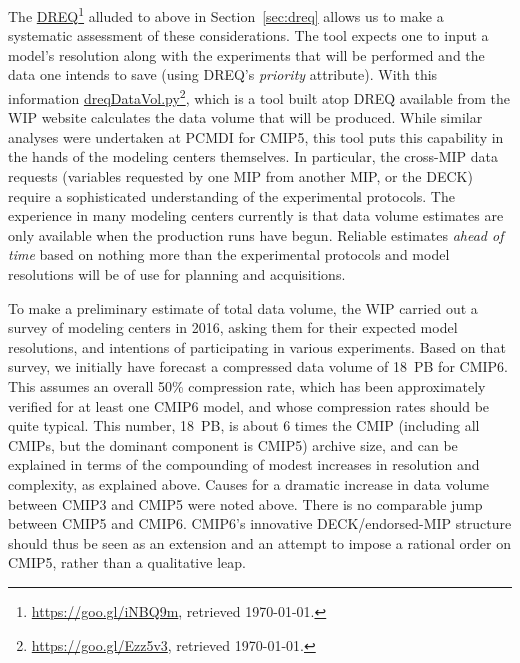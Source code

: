 \documentclass[gmd,manuscript]{copernicus}
\newcommand{\pllabel}[1]{\label{p-#1}\linelabel{l-#1}}
\newcommand{\urlref}[2] {\href{#1}{#2}\footnote{\url{#1}, retrieved \today.}}
\begin{document}
The \urlref{https://goo.gl/iNBQ9m}{DREQ} alluded to above in
Section~\ref{sec:dreq} allows us to make a systematic assessment of these
considerations. The tool expects one to input a model's resolution
along with the experiments that will be performed and the data one
intends to save (using DREQ's \emph{priority} attribute). With this
information
\urlref{https://goo.gl/Ezz5v3}{dreqDataVol.py}, which is a tool 
built atop DREQ available from the WIP website calculates the
data volume that will be produced. While similar
analyses were undertaken at PCMDI for CMIP5, this tool puts this
capability in the hands of the modeling centers themselves.
\pllabel{RC1-26}
In particular, the cross-MIP data requests (variables requested by one
MIP from another MIP, or the DECK) require a sophisticated
understanding of the experimental protocols. The experience in many
modeling centers currently is that data volume estimates are only
available when the production runs have begun. Reliable estimates
\emph{ahead of time} based on nothing more than the experimental
protocols and model resolutions will be of use for planning and
acquisitions.

To make a preliminary estimate of total data volume, the WIP carried
out a survey of modeling centers in 2016, asking them for their
expected model resolutions, and intentions of participating in various
experiments. Based on that survey, we initially have forecast a
\pllabel{RC1-27}
compressed data volume of 18~PB for CMIP6. This assumes an overall
50\% compression rate, which has been approximately verified for at
least one CMIP6 model, and whose compression rates should be quite
typical. This number, 18~PB, is about 6 times the CMIP
\pllabel{RC1-28}
(including all CMIPs, but the dominant component is CMIP5) archive
size, and can be explained in terms of the compounding of modest
increases in resolution and complexity, as explained above.
\pllabel{RC1-29b}
Causes for a dramatic increase in data volume between CMIP3 and CMIP5
were noted above. There is no comparable jump between CMIP5 and CMIP6.
CMIP6's innovative DECK/endorsed-MIP structure should thus be seen as
an extension and an attempt to impose a rational order on CMIP5,
rather than a qualitative leap.
\end{document}
